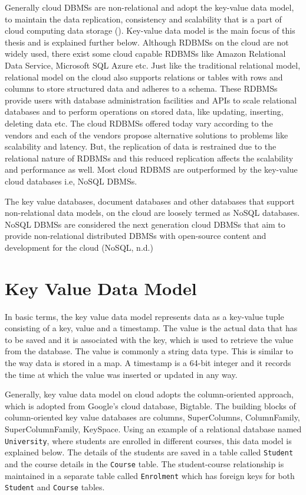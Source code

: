 Generally cloud \acp{DBMS} are non-relational and adopt the key-value data
model, to maintain the data replication, consistency and scalability that is a
part of cloud computing data storage (). Key-value data model is the main
focus of this thesis and is explained further below. Although \acp{RDBMS} on the cloud are
not widely used, there exist some cloud capable \acp{RDBMS} like Amazon Relational
Data Service, Microsoft SQL Azure etc. Just like the traditional relational model, 
relational model on the cloud also supports relations or tables with rows and
columns to store structured data and adheres to a schema. These \acp{RDBMS} provide users with database
administration facilities and APIs to scale relational databases and to perform
operations on stored data, like updating, inserting, deleting data etc. The
cloud \acp{RDBMS} offered today vary according to the vendors and each of the vendors
propose alternative solutions to problems like scalability and latency. But, the
replication of data is restrained due to the relational nature of \acp{RDBMS} and this reduced
replication affects the scalability and performance as well. Most cloud
\ac{RDBMS} are outperformed by the key-value cloud databases i.e, \ac{NoSQL} \acp{DBMS}. 

The key value databases, document databases and other databases that support
non-relational data models, on the cloud are loosely termed as  \ac{NoSQL}
databases. \ac{NoSQL} \acp{DBMS} are considered the next generation cloud \acp{DBMS} that aim to provide non-relational distributed \acp{DBMS} with open-source content and
development for the cloud (\ac{NoSQL}, n.d.)



\section{Key Value Data Model}\label{s:key-value-data-model}
In basic terms, the key value data model represents data as a key-value tuple
consisting of a key, value and a timestamp. The value is the actual data that
has to be saved and it is associated with the key, which is used to retrieve the
value from the database. The value is commonly a string data type. This is
similar to the way data is stored in a map. A timestamp is a 64-bit integer and
it records the time at which the value was inserted or updated in any way.

Generally, key value data model on cloud adopts the column-oriented approach,
which is adopted from Google's  cloud database, Bigtable.
The building blocks of column-oriented key value databases are columns,
SuperColumns, ColumnFamily, SuperColumnFamily, KeySpace. Using an example of a
relational database named \texttt{University}, where students are enrolled in
different courses, this data model is explained below. The details of the students are
saved in a table called \texttt{Student} and the course details in the \texttt{Course} table.
The student-course relationship is maintained in a separate table called
\texttt{Enrolment} which has foreign keys for both \texttt{Student} and \texttt{Course} tables.

